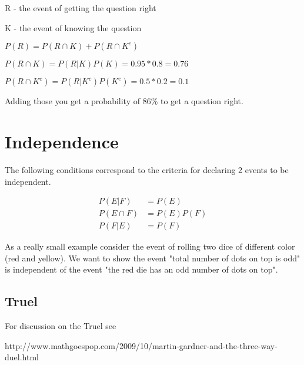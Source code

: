 \documentclass[12pt]{article}
\begin{document}
R - the event of getting the question right

K - the event of knowing the question

$P(R) = P(R \cap K) + P(R \cap K^c)$

$P(R \cap K) = P(R|K)P(K) = 0.95 * 0.8 = 0.76$

$P(R \cap K^c) = P(R|K^c)P(K^c) = 0.5 * 0.2 = 0.1$

Adding those you get a probability of 86\% to get a question right.

\section*{Independence}

The following conditions correspond to the criteria for declaring 2 events to be independent.

\begin{align*}
P(E|F) &= P(E) \\
P(E \cap F) &= P(E)P(F) \\
P(F|E) &= P(F)
\end{align*}

\medskip

As a really small example consider the event of rolling two dice of different color (red and yellow). We want to show the event "total number of dots on top is odd" is independent of the event "the red die has an odd number of dots on top".


\subsection*{Truel}

For discussion on the Truel see 


http://www.mathgoespop.com/2009/10/martin-gardner-and-the-three-way-duel.html
\end{document}
